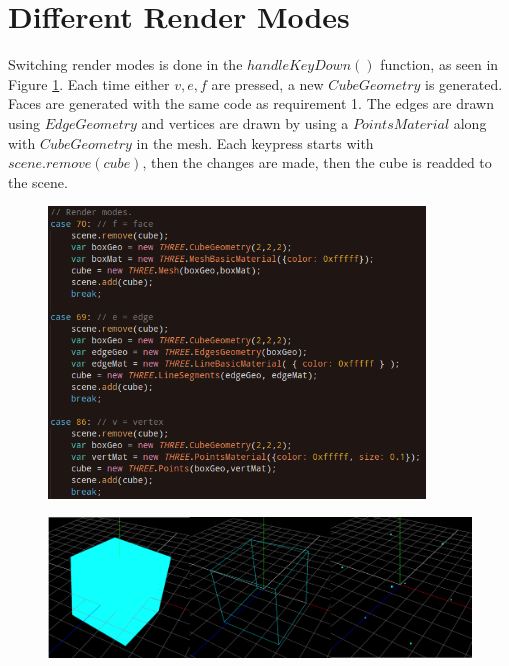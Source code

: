 \documentclass[12pt]{article}
\begin{document}
\section{Different Render Modes}
Switching render modes is done in the $handleKeyDown()$ function, as seen in Figure \ref{fig:5}. Each time either $v,e,f$ are pressed, a new $CubeGeometry$ is generated.
Faces are generated with the same code as requirement 1. The edges are drawn using $EdgeGeometry$ and vertices are drawn by using a $PointsMaterial$ along with $CubeGeometry$ in the mesh. Each
keypress starts with $scene.remove(cube)$, then the changes are made, then the cube is readded to the scene.
\begin{figure}[H]  
  \centering
  \includegraphics[width=10cm]{5.png}
  \caption{}
  \label{fig:5}
\end{figure}
\begin{figure}[H]  
  \centering
  \includegraphics[width=\textwidth]{8910.png}
  \caption{}
  \label{fig:6}
\end{figure}
\end{document}
